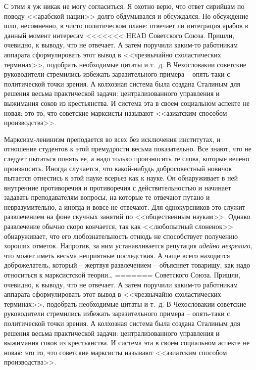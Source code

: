 \documentclass{book}
\begin{document}
С этим я уж никак не могу согласиться. Я охотно верю, что ответ сирийцам по поводу <<арабской нации>> долго обду­мывался и 
обсуждался. Но обсуждение шло, несомненно, в чи­сто политическом плане: отвечает ли интеграция арабов в дан­ный момент интересам 
<<<<<<< HEAD
Советского Союза. Пришли, очевидно, к выводу, что не отвечает. А затем поручили каким‑то работ­никам аппарата сформулировать этот 
вывод в <<чрезвычайно схоластических терминах>>, подобрать необходимые цитаты и т.~д. В Чехословакии советские руководители 
стремились из­бежать заразительного примера -- опять‑таки с политической точки зрения. А колхозная система была создана Сталиным 
для решения весьма практической задачи: централизованного управления и выжимания соков из крестьянства. И система эта в своем 
социальном аспекте не новая: это то, что совет­ские марксисты называют <<азиатским способом производства>>.

Марксизм‑ленинизм преподается во всех без исключения институтах, и отношение студентов к этой премудрости весь­ма показательно. Все знают, что не следует пытаться понять ее, а надо только произносить те слова, которые велено произ­носить. Иногда случается, что какой‑нибудь добросовестный новичок пытается отнестись к этой науке всерьез как к науке. Он обнаруживает в ней внутренние противоречия и противо­речия с действительностью и начинает задавать преподавате­лям вопросы, на которые те отвечают путано и невразумитель­но, а иногда и вовсе не отвечают. Для однокурсников это слу­жит развлечением на фоне скучных занятий по <<общественным наукам>>. Однако развлечение обычно скоро кончается, так как <<любопытный слоненок>> обнаруживает, что его любозна­тельность отнюдь не способствует получению хороших отметок. Напротив, за ним устанавливается репутация \textit{идейно незрелого,} что может иметь весьма неприятные последствия. А чаще всего находится доброжелатель, который -- жертвуя развлечением -- объясняет товарищу, как надо относиться к марксистской теории\ldots
=======
Советского Союза. Пришли, очевидно, к выводу, что не отвечает. А затем поручили каким-то работ­никам аппарата сформулировать этот 
вывод в <<чрезвычайно схоластических терминах>>, подобрать необходимые цитаты и т.~д. В Чехословакии советские руководители 
стремились из­бежать заразительного примера -- опять-таки с политической точки зрения. А колхозная система была создана Сталиным 
для решения весьма практической задачи: централизованного управления и выжимания соков из крестьянства. И система эта в своем 
социальном аспекте не новая: это то, что совет­ские марксисты называют <<азиатским способом производства>>.
\end{document}
